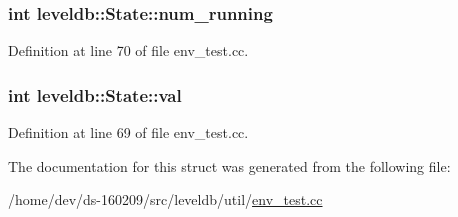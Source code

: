 \subsubsection[{num\+\_\+running}]{\setlength{\rightskip}{0pt plus 5cm}int leveldb\+::\+State\+::num\+\_\+running}\label{structleveldb_1_1_state_a6e84d8550d17c6c3edda2e114a634e61}


Definition at line 70 of file env\+\_\+test.\+cc.

\hypertarget{structleveldb_1_1_state_adfc3479f732e7396e735991e48963981}{}
\subsubsection[{val}]{\setlength{\rightskip}{0pt plus 5cm}int leveldb\+::\+State\+::val}\label{structleveldb_1_1_state_adfc3479f732e7396e735991e48963981}


Definition at line 69 of file env\+\_\+test.\+cc.



The documentation for this struct was generated from the following file\+:\begin{DoxyCompactItemize}
\item 
/home/dev/ds-\/160209/src/leveldb/util/\hyperlink{env__test_8cc}{env\+\_\+test.\+cc}\end{DoxyCompactItemize}
